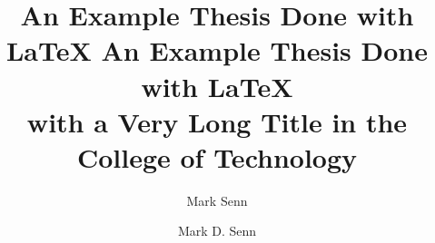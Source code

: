 \documentclass[tech,thesisproposal,apacite,nochapterblankpages,uglyheadings]{puthesis-cot}
\title{An Example Thesis Done with \LaTeX}
\title{%
  An Example Thesis Done with \LaTeX\\
  with a Very Long Title in the\\
  College of Technology%
}
\author{Mark Senn}{Senn, Mark}
\author{Mark D. Senn}{Senn, Mark D.}
\begin{document}
\volume













\appendices











\end{document}
